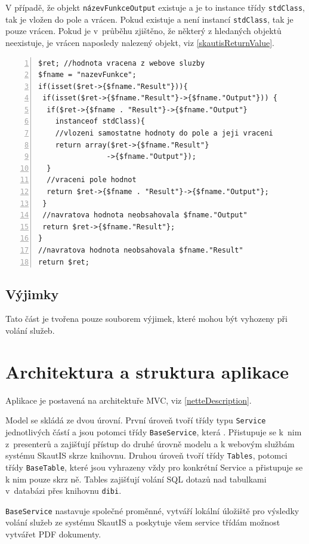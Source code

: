 \documentclass[thesis=B,czech]{FITthesis}[2011/06/14]
\begin{document}
V případě, že objekt \texttt{názevFunkceOutput} existuje a je to instance třídy \texttt{stdClass}, tak je vložen do pole a vrácen. Pokud existuje a není instancí \texttt{stdClass}, tak je pouze vrácen.
Pokud je v~průběhu zjištěno, že některý z hledaných objektů neexistuje, je vrácen naposledy nalezený objekt, viz \ref{skautisReturnValue}.

\begin{lstlisting}[caption=zpracování návratové hodnoty od webové služby, label=skautisReturnValue, numbers=left]
$ret; //hodnota vracena z webove sluzby
$fname = "nazevFunkce";
if(isset($ret->{$fname."Result"})){
 if(isset($ret->{$fname."Result"}->{$fname."Output"})) {
  if($ret->{$fname . "Result"}->{$fname."Output"}
  	instanceof stdClass){
    //vlozeni samostatne hodnoty do pole a jeji vraceni
    return array($ret->{$fname."Result"}
    			->{$fname."Output"});
  }
  //vraceni pole hodnot
  return $ret->{$fname . "Result"}->{$fname."Output"};
 }
 //navratova hodnota neobsahovala $fname."Output"
 return $ret->{$fname."Result"};
}
//navratova hodnota neobsahovala $fname."Result"
return $ret;
\end{lstlisting}

\subsection{Výjimky}
Tato část je tvořena pouze souborem výjimek, které mohou být vyhozeny při volání služeb.

\section{Architektura a struktura aplikace}
Aplikace je postavená na architektuře MVC, viz \ref{netteDescription}.

Model se skládá ze dvou úrovní. První úroveň tvoří třídy typu \texttt{Service} jednotlivých částí a jsou potomci třídy \texttt{BaseService}, která . Přistupuje se k~nim z~presenterů a zajišťují přístup do druhé úrovně modelu a k webovým službám systému SkautIS skrze knihovnu. Druhou úroveň tvoří třídy \texttt{Tables}, potomci třídy \texttt{BaseTable}, které jsou vyhrazeny vždy pro konkrétní Service a přistupuje se k nim pouze skrz ně. Tables zajišťují volání SQL dotazů nad tabulkami v~databázi přes knihovnu \texttt{dibi}.

\texttt{BaseService} nastavuje společné proměnné, vytváří lokální úložiště pro výsledky volání služeb ze systému SkautIS a poskytuje všem service třídám možnost vytvářet PDF dokumenty.
\end{document}
